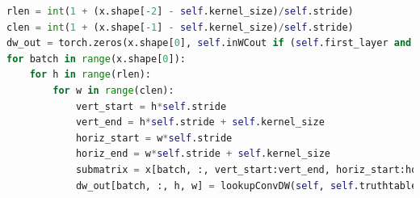 \begin{lstlisting}[language=Python, caption=Implementing Truth Table Functional Verification, label=convFuncVerif]
rlen = int(1 + (x.shape[-2] - self.kernel_size)/self.stride)
clen = int(1 + (x.shape[-1] - self.kernel_size)/self.stride)
dw_out = torch.zeros(x.shape[0], self.inWCout if (self.first_layer and self.inWCin==1) else self.inWCin, rlen, clen)        
for batch in range(x.shape[0]):
    for h in range(rlen):
        for w in range(clen):
            vert_start = h*self.stride
            vert_end = h*self.stride + self.kernel_size
            horiz_start = w*self.stride
            horiz_end = w*self.stride + self.kernel_size
            submatrix = x[batch, :, vert_start:vert_end, horiz_start:horiz_end]
            dw_out[batch, :, h, w] = lookupConvDW(self, self.truthtable['dw'], submatrix, (self.first_layer and self.inWCin==1))
\end{lstlisting}

